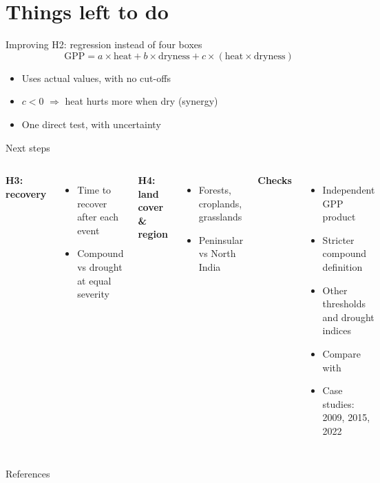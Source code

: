 \documentclass[11pt,aspectratio=169]{beamer}
\begin{document}
\section{Things left to do}

\begin{frame}{Improving H2: regression instead of four boxes}
  \[
    \text{GPP} = a \times \text{heat} + b \times \text{dryness}
      + c \times (\text{heat} \times \text{dryness})
  \]
  \begin{itemize}
    \item Uses actual values, with no cut-offs
    \item $c < 0$ $\Rightarrow$ heat hurts more when dry (synergy)
    \item One direct test, with uncertainty
  \end{itemize}
\end{frame}

\begin{frame}{Next steps}
  \begin{columns}[T]
    \textbf{H3: recovery}
    \begin{itemize}
      \item Time to recover after each event
      \item Compound vs drought at equal severity
    \end{itemize}

    \vspace{6pt}
    \textbf{H4: land cover \& region}
    \begin{itemize}
      \item Forests, croplands, grasslands
      \item Peninsular vs North India
    \end{itemize}
    \textbf{Checks}
    \begin{itemize}
      \item Independent GPP product
      \item Stricter compound definition
      \item Other thresholds and drought indices
      \item Compare with \citet{meena2026}
      \item Case studies: 2009, 2015, 2022
    \end{itemize}
  \end{columns}
\end{frame}

\begin{frame}[allowframebreaks]{References}
  \scriptsize
  
\end{frame}
\end{document}
